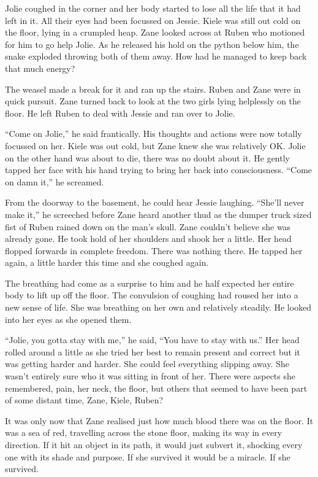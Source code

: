 Jolie coughed in the corner and her body started to lose all the life that it had left in it.  All their eyes had been focussed on Jessie.  Kiele was still out cold on the floor, lying in a crumpled heap.  Zane looked across at Ruben who motioned for him to go help Jolie.  As he released his hold on the python below him, the snake exploded throwing both of them away.  How had he managed to keep back that much energy?

The weasel made a break for it and ran up the stairs.  Ruben and Zane were in quick pursuit.  Zane turned back to look at the two girls lying helplessly on the floor.  He left Ruben to deal with Jessie and ran over to Jolie.  

``Come on Jolie,'' he said frantically.  His thoughts and actions were now totally focussed on her.  Kiele was out cold, but Zane knew she was relatively OK.  Jolie on the other hand was about to die, there was no doubt about it.  He gently tapped her face with his hand trying to bring her back into consciousness.  ``Come on damn it,'' he screamed.  

From the doorway to the basement, he could hear Jessie laughing.  ``She'll never make it,'' he screeched before Zane heard another thud as the dumper truck sized fist of Ruben rained down on the man's skull.  Zane couldn't believe she was already gone.  He took hold of her shoulders and shook her a little.  Her head flopped forwards in complete freedom.  There was nothing there.  He tapped her again, a little harder this time and she coughed again.  

The breathing had come as a surprise to him and he half expected her entire body to lift up off the floor.  The convulsion of coughing had roused her into a new sense of life.  She was breathing on her own and relatively steadily.  He looked into her eyes as she opened them.

``Jolie, you gotta stay with me,'' he said, ``You have to stay with us.''  Her head rolled around a little as she tried her best to remain present and correct but it was getting harder and harder.  She could feel everything slipping away.  She wasn't entirely sure who it was sitting in front of her.  There were aspects she remembered, pain, her neck, the floor, but others that seemed to have been part of some distant time, Zane, Kiele, Ruben?

It was only now that Zane realised just how much blood there was on the floor.  It was a sea of red, travelling across the stone floor, making its way in every direction.  If it hit an object in its path, it would just subvert it, shocking every one with its shade and purpose.  If she survived it would be a miracle.  If she survived.

